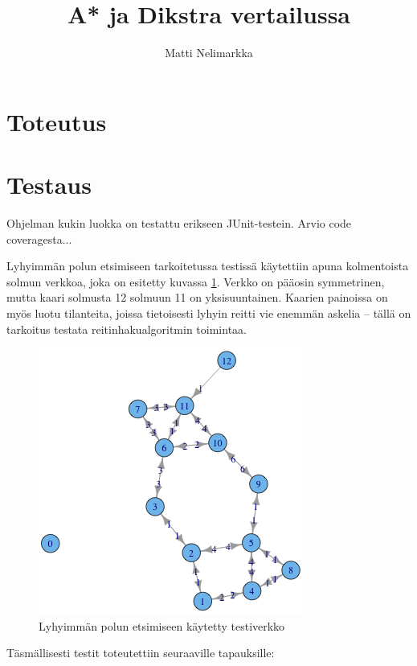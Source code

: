 \documentclass[10pt,a4paper]{article}
\begin{document}
\title{A* ja Dikstra vertailussa}
\author{Matti Nelimarkka}

\maketitle

\newpage

\section{Toteutus}



\section{Testaus}

Ohjelman kukin luokka on testattu erikseen JUnit-testein. Arvio code coveragesta...

Lyhyimmän polun etsimiseen tarkoitetussa testissä käytettiin apuna kolmentoista solmun verkkoa, joka on esitetty kuvassa \ref{testiverkko}. Verkko on pääosin symmetrinen, mutta kaari solmusta 12 solmuun 11 on yksisuuntainen. Kaarien painoissa on myös luotu tilanteita, joissa tietoisesti lyhyin reitti vie enemmän askelia -- tällä on tarkoitus testata reitinhakualgoritmin toimintaa.

\begin{figure}
\includegraphics[scale=.5]{test_network.png} 
\caption{Lyhyimmän polun etsimiseen käytetty testiverkko}
\label{testiverkko}
\end{figure}

Täsmällisesti testit toteutettiin seuraaville tapauksille:
\end{document}
